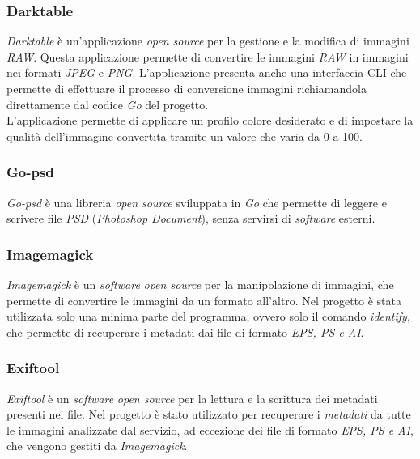 \subsubsection{Darktable}

\emph{Darktable} è un'applicazione \emph{open source} per la gestione e la
modifica di immagini \emph{RAW}. Questa applicazione permette di convertire le
immagini \emph{RAW} in immagini nei formati \emph{JPEG} e \emph{PNG}.
L'applicazione presenta anche una interfaccia \glsfirstoccur\gls{CLI} che
permette di effettuare il processo di conversione immagini richiamandola
direttamente dal codice \emph{Go} del progetto.\\
L'applicazione permette di applicare un profilo colore desiderato e di impostare
la qualità dell'immagine convertita tramite un valore che varia da 0 a 100. \cite{darktable}

\subsubsection{Go-psd}

\emph{Go-psd} è una libreria \emph{open source} sviluppata in \emph{Go} che
permette di leggere e scrivere file \emph{PSD} (\emph{Photoshop Document}),
senza servirsi di \emph{software} esterni. \cite{go-psd}

\subsubsection{Imagemagick}

\emph{Imagemagick} è un \emph{software} \emph{open source} per la manipolazione
di immagini, che permette di convertire le immagini da un formato all'altro.
Nel progetto è stata utilizzata solo una minima parte del programma, ovvero
solo il comando \emph{identify}, che permette di recuperare i metadati dai file
di formato \emph{EPS, PS e AI}. \cite{imagemagick}

\subsubsection{Exiftool}

\emph{Exiftool} è un \emph{software} \emph{open source} per la lettura e la
scrittura dei metadati presenti nei file. Nel progetto è stato utilizzato per
recuperare i \emph{metadati} da tutte le immagini analizzate dal servizio, ad
eccezione dei file di formato \emph{EPS, PS e AI}, che vengono gestiti da
\emph{Imagemagick}.\cite{exiftool}

